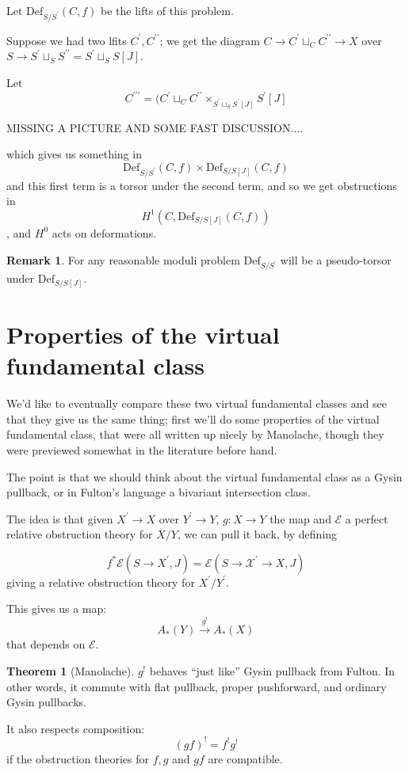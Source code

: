 \documentclass{amsart}
\theoremstyle{definition}
\newtheorem{remark}[dummy]{Remark}
\newtheorem{theorem}[dummy]{Theorem}
\newcommand{\Def}{\text{Def}}
\newcommand{\X}{\mathcal{X}}
\begin{document}
Let $\Def_{S/S^\prime}(C,f)$ be the lifts of this problem.

Suppose we had two lfits $C^\prime, C^{\prime\prime}$; we get the diagram $C\to C^\prime\sqcup_C C^{\prime\prime}\to X$ over $S\to S^\prime\sqcup_SS^{\prime\prime}=S^\prime\sqcup_S S[J]$.

Let
$$C^{\prime\prime\prime}=(C^\prime\sqcup_C C^{\prime\prime}\times_{S^\prime\sqcup_S S^\prime[J]} S^\prime[J]$$

MISSING A PICTURE AND SOME FAST DISCUSSION....

which gives us something in
$$\Def_{S/S^\prime}(C,f)\times\Def_{S/S[J]}(C,f)$$
and this first term is a torsor under the second term, and so we get obstructions in
$$H^1(C, \Def_{S/S[J]}(C,f))$$, and $H^0$ acts on deformations.


\begin{remark}
For any reasonable moduli problem $\Def_{S/S^\prime}$ will be a pseudo-torsor under $\Def_{S/S[J]}$.
\end{remark}

\section{Properties of the virtual fundamental class}
We'd like to eventually compare these two virtual fundamental classes and see that they give us the same thing; first we'll do some properties of the virtual fundamental class, that were all written up nicely by Manolache, though they were previewed somewhat in the literature before hand.


The point is that we should think about the virtual fundamental class as a Gysin pullback, or in Fulton's language a bivariant intersection class.

The idea is that given $X^\prime\to X$ over $Y^\prime\to Y$, $g:X\to Y$ the map and $\mathcal{E}$ a perfect relative obstruction theory for $X/Y$, we can pull it back, by defining

$$f^*\mathcal{E}(S\to X^\prime, J)=\mathcal{E}(S\to\X^\prime\to X, J)$$
giving a relative obstruction theory for $X^\prime/Y^\prime$.

This gives us a  map:
$$A_*(Y)\stackrel{g^!}\to A_*(X)$$
that depends on $\mathcal{E}$.

\begin{theorem}[Manolache]
$g^!$ behaves ``just like'' Gysin pullback from Fulton.  In other words, it commute with flat pullback, proper pushforward, and ordinary Gysin pullbacks.

It also respects composition: 
$$(gf)^!=f^!g^!$$
if the obstruction theories for $f, g$ and $gf$ are compatible.
\end{theorem}
\end{document}
